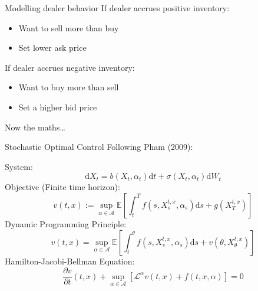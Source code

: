 \documentclass{beamer} %
\begin{document}
\begin{frame}{Modelling dealer behavior}
    If dealer accrues positive inventory:
    \begin{itemize}
        \item Want to sell more than buy
        \item Set lower ask price
    \end{itemize}
    If dealer accrues negative inventory:
    \begin{itemize}
        \item Want to buy more than sell
        \item Set a higher bid price
    \end{itemize}
    Now the maths\dots
\end{frame}

\begin{frame}{Stochastic Optimal Control}
    Following Pham (2009):

    System:
    \begin{equation}
        \mathrm dX_t=b(X_t,\alpha_t)\mathrm dt+\sigma(X_t,\alpha_t)\mathrm dW_t
    \end{equation}
    Objective (Finite time horizon):
    \begin{equation}
        v(t,x):=\sup_{\alpha\in\mathcal A}\mathbb{E}\left[\int_t^Tf(s,X_s^{t,x},\alpha_s)\mathrm ds+g(X_T^{t,x})\right]
    \end{equation}
    Dynamic Programming Principle:
    \begin{equation}
        v(t,x)=\sup_{\alpha\in\mathcal A}\mathbb{E}\left[\int_t^\theta f(s,X_s^{t,x},\alpha_s)\mathrm ds+v(\theta,X_\theta^{t,x})\right]
    \end{equation}
    Hamilton-Jacobi-Bellman Equation:
    \begin{equation}
        \frac{\partial v}{\partial t}(t,x)+\sup_{\alpha\in\mathcal{A}}\left[\mathcal{L}^\alpha v(t,x)+f(t,x,\alpha)\right]=0
    \end{equation}
\end{frame}
\end{document}
